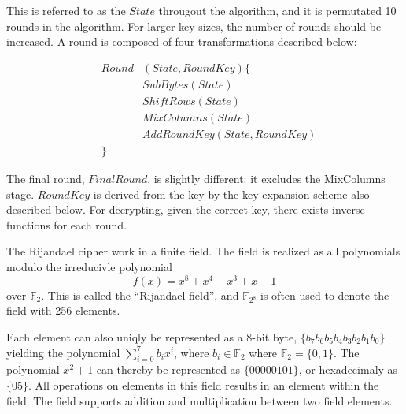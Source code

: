 This is referred to as the $State$ througout the algorithm, and it
is permutated 10 rounds in the algorithm. For larger key sizes, the
number of rounds should be increased. A round is composed of four
transformations described below:

\begin{eqnarray*}
&Round&(State, RoundKey) \{\\
  & &SubBytes (State)\\
  & &ShiftRows (State)\\
  & &MixColumns (State)\\
  & &AddRoundKey (State, RoundKey)\\
&\}&
\end{eqnarray*}

The final round, $FinalRound$, is slightly different: it excludes the
MixColumns stage. $RoundKey$ is derived from the key by the key
expansion scheme also described below. For decrypting, given the
correct key, there exists inverse functions for each round.

The Rijandael cipher work in a finite field. The field is realized as
all polynomials modulo the irreducivle polynomial 
\begin{equation}
  f(x) = x^8 + x^4 + x^3 + x + 1
  \label{eq:gf}
\end{equation} 
over $\mathbb{F}_2$. This is called the ``Rijandael
field'', and $\mathbb{F}_{2^8}$ is often used to denote the field with
256 elements.

Each element can also uniqly be represented as a 8-bit byte, $\{b_7
b_6 b_5 b_4 b_3 b_2 b_1 b_0\}$ yielding the polynomial $\sum_{i=0}^7
b_i x^i$, where $b_i \in \mathbb{F}_2$ where $\mathbb{F}_2 =
\{0,1\}$. The polynomial $x^2 + 1$ can thereby be represented as
$\{00000101\}$, or hexadecimaly as $\{05\}$.  All operations on
elements in this field results in an element within the field. The
field supports addition and multiplication between two field elements.

